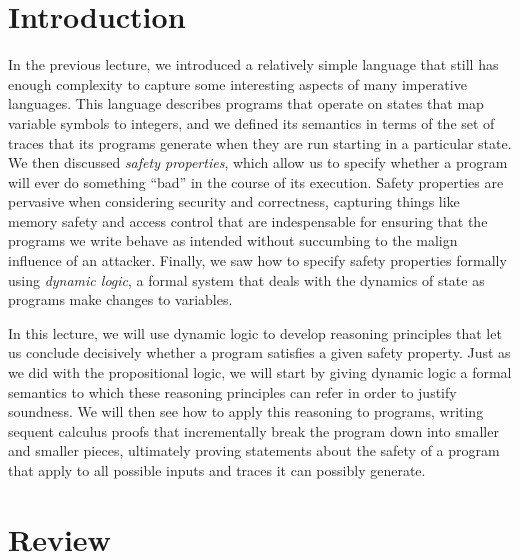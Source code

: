 \documentclass[11pt,twoside]{scrartcl}
\begin{document}
\newcommand{\atrace}{\sigma}%
\newcommand{\stdI}{\dTLint[state=\omega]}%
\newcommand{\Ip}{\dTLint[trace=\atrace]}%
\newcommand{\ws}{\omega}\newcommand{\wt}{\nu}%

\maketitle
\thispagestyle{empty}


\section{Introduction}

In the previous lecture, we introduced a relatively simple language that still has enough complexity to capture some interesting aspects of many imperative languages.
This language describes programs that operate on states that map variable symbols to integers, and we defined its semantics in terms of the set of traces that its programs generate when they are run starting in a particular state.
We then discussed \emph{safety properties}, which allow us to specify whether a program will ever do something ``bad'' in the course of its execution.
Safety properties are pervasive when considering security and correctness, capturing things like memory safety and access control that are indespensable for ensuring that the programs we write behave as intended without succumbing to the malign influence of an attacker.
Finally, we saw how to specify safety properties formally using \emph{dynamic logic}, a formal system that deals with the dynamics of state as programs make changes to variables.

In this lecture, we will use dynamic logic to develop reasoning principles that let us conclude decisively whether a program satisfies a given safety property.
Just as we did with the propositional logic, we will start by giving dynamic logic a formal semantics to which these reasoning principles can refer in order to justify soundness.
We will then see how to apply this reasoning to programs, writing sequent calculus proofs that incrementally break the program down into smaller and smaller pieces, ultimately proving statements about the safety of a program that apply to all possible inputs and traces it can possibly generate.

\section{Review}
\end{document}
